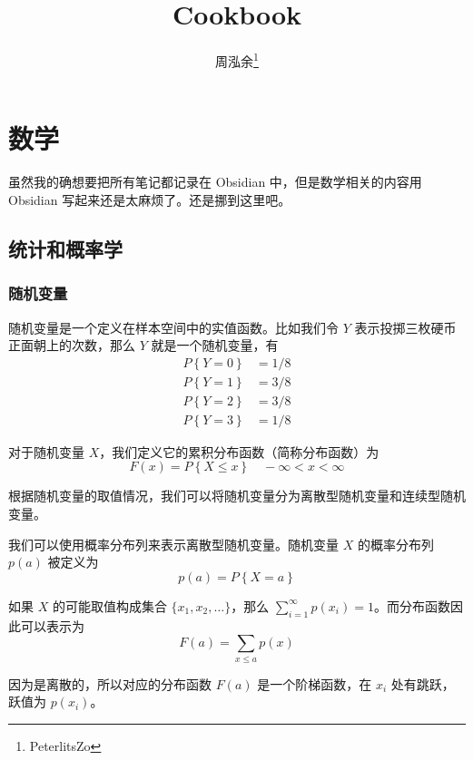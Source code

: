 \documentclass[utf8,a4paper,nofonts,9pt]{ctexbook}
\title{Cookbook}
\author{周泓余\thanks{PeterlitsZo}}
\begin{document}
\maketitle

\tableofcontents
\newpage





\part{数学}

虽然我的确想要把所有笔记都记录在 Obsidian 中，但是数学相关的内容用 Obsidian 写起来还是太麻烦了。还是挪到这里吧。




\chapter{统计和概率学}



\section{随机变量}

随机变量是一个定义在样本空间中的实值函数。比如我们令 $Y$ 表示投掷三枚硬币正面朝上的次数，那么 $Y$ 就是一个随机变量，有
\begin{align*}
    P\left\{Y = 0\right\} & = 1 / 8 \\
    P\left\{Y = 1\right\} & = 3 / 8 \\
    P\left\{Y = 2\right\} & = 3 / 8 \\
    P\left\{Y = 3\right\} & = 1 / 8
\end{align*}

对于随机变量 $X$，我们定义它的累积分布函数（简称分布函数）为
\[
    F(x) = P\left\{ X \le x \right\} \quad -\infty < x < \infty
\]

根据随机变量的取值情况，我们可以将随机变量分为离散型随机变量和连续型随机变量。

我们可以使用概率分布列来表示离散型随机变量。随机变量 $X$ 的概率分布列 $p(a)$ 被定义为
\[
    p(a) = P\left\{ X = a \right\}
\]

如果 $X$ 的可能取值构成集合 $\{x_1, x_2, \ldots\}$，那么 $\sum_{i = 1}^\infty p(x_i) = 1$。而分布函数因此可以表示为
\[
    F(a) = \sum_{x \le a} p(x)
\]

因为是离散的，所以对应的分布函数 $F(a)$ 是一个阶梯函数，在 $x_i$ 处有跳跃，跃值为 $p(x_i)$。
\end{document}
